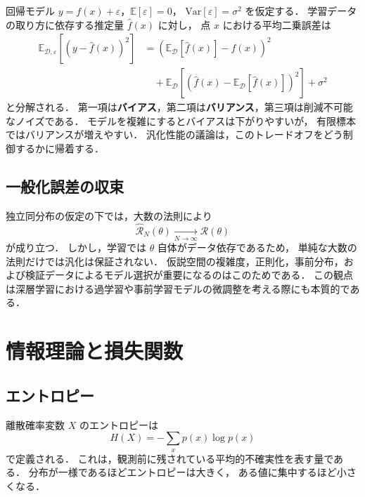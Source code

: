 回帰モデル $y = f(x) + \varepsilon$，$\mathbb{E}[\varepsilon]=0$，
$\mathrm{Var}[\varepsilon]=\sigma^{2}$ を仮定する．
学習データの取り方に依存する推定量 $\hat{f}(x)$ に対し，
点 $x$ における平均二乗誤差は
\begin{align}
  \mathbb{E}_{\mathcal{D},\varepsilon}
  \left[
    (y-\hat{f}(x))^{2}
  \right]
  &=
  \left(
    \mathbb{E}_{\mathcal{D}}[\hat{f}(x)] - f(x)
  \right)^{2}
  \nonumber\\
  &\quad
  +
  \mathbb{E}_{\mathcal{D}}
  \left[
    \left(
      \hat{f}(x)-\mathbb{E}_{\mathcal{D}}[\hat{f}(x)]
    \right)^{2}
  \right]
  + \sigma^{2}
  \label{eq:bias-variance}
\end{align}
と分解される．
第一項は\textbf{バイアス}，第二項は\textbf{バリアンス}，第三項は削減不可能なノイズである．
モデルを複雑にするとバイアスは下がりやすいが，
有限標本ではバリアンスが増えやすい．
汎化性能の議論は，このトレードオフをどう制御するかに帰着する．

\subsection{一般化誤差の収束}

独立同分布の仮定の下では，大数の法則により
\begin{equation}
  \hat{\mathcal{R}}_{N}(\theta)
  \xrightarrow[N\to\infty]{}
  \mathcal{R}(\theta)
  \label{eq:lln-risk}
\end{equation}
が成り立つ．
しかし，学習では $\theta$ 自体がデータ依存であるため，
単純な大数の法則だけでは汎化は保証されない．
仮説空間の複雑度，正則化，事前分布，および検証データによるモデル選択が重要になるのはこのためである．
この観点は深層学習における過学習や事前学習モデルの微調整を考える際にも本質的である．

\section{情報理論と損失関数}
\label{sec:ml-information}

\subsection{エントロピー}

離散確率変数 $X$ のエントロピーは
\begin{equation}
  H(X) = - \sum_{x} p(x)\log p(x)
  \label{eq:entropy}
\end{equation}
で定義される\cite{Shannon1948}．
これは，観測前に残されている平均的不確実性を表す量である．
分布が一様であるほどエントロピーは大きく，
ある値に集中するほど小さくなる．

